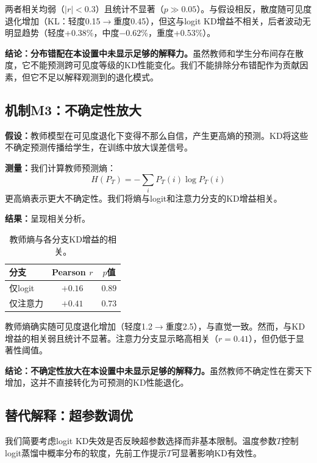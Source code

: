 两者相关均弱（$|r| < 0.3$）且统计不显著（$p \gg 0.05$）。与假设相反，散度随可见度退化增加（KL：轻度0.15$\to$重度0.45），但这与logit KD增益不相关，后者波动无明显趋势（轻度+0.38\%，中度$-0.62$\%，重度+0.53\%）。

\textbf{结论：分布错配在本设置中未显示足够的解释力。}虽然教师和学生分布间存在散度，它不能预测跨可见度等级的KD性能变化。我们不能排除分布错配作为贡献因素，但它不足以解释观测到的退化模式。

\subsection{机制M3：不确定性放大}

\textbf{假设：}教师模型在可见度退化下变得不那么自信，产生更高熵的预测。KD将这些不确定预测传播给学生，在训练中放大误差信号\cite{kendall2017uncertainties}。

\textbf{测量：}我们计算教师预测熵：
\begin{equation}
H(P_T) = -\sum_i P_T(i) \log P_T(i)
\end{equation}
更高熵表示更大不确定性。我们将熵与logit和注意力分支的KD增益相关。

\textbf{结果：}呈现相关分析。

\begin{table}[htbp]
\centering
\caption{教师熵与各分支KD增益的相关。}
\label{tab:entropy_corr}
\begin{tabular}{@{}lcc@{}}
\toprule
分支 & Pearson $r$ & $p$值 \\
\midrule
仅logit & $+0.16$ & $0.89$ \\
仅注意力 & $+0.41$ & $0.73$ \\
\bottomrule
\end{tabular}
\end{table}

教师熵确实随可见度退化增加（轻度1.2$\to$重度2.5），与直觉一致。然而，与KD增益的相关弱且统计不显著。注意力分支显示略高相关（$r=0.41$），但仍低于显著性阈值。

\textbf{结论：不确定性放大在本设置中未显示足够的解释力。}虽然教师不确定性在雾天下增加，这并不直接转化为可预测的KD性能退化。

\subsection{替代解释：超参数调优}

我们简要考虑logit KD失效是否反映超参数选择而非基本限制。温度参数$T$控制logit蒸馏中概率分布的软度，先前工作提示$T$可显著影响KD有效性。

